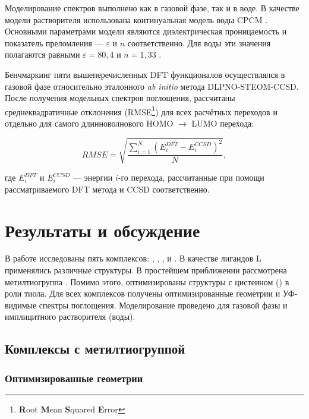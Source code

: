 \documentclass[a4paper,12pt]{article}
\newcommand{\rarr}{\rightarrow}
\begin{document}
\begin{onehalfspace}
	Моделирование спектров выполнено как в газовой фазе, так и в воде. В качестве модели растворителя использована континуальная модель воды CPCM \cite{ORCA_cpcm_1}. Основными параметрами модели являются диэлектрическая проницаемость и показатель преломления — $\varepsilon$ и $n$ соответственно. Для воды эти значения полагаются равными $\varepsilon=80,4$ и $n=1,33$ \cite{ORCA_cpcm_2}.
	
	Бенчмаркинг пяти вышеперечисленных DFT функционалов осуществлялся в газовой фазе относительно эталонного \textit{ab initio} метода DLPNO-STEOM-CCSD. После получения модельных спектров поглощения, рассчитаны среднеквадратичные отклонения (RMSE\footnote{\textbf{R}oot \textbf{M}ean \textbf{S}quared \textbf{E}rror}) для всех расчётных переходов и отдельно для самого длинноволнового HOMO $\rarr$ LUMO перехода:
	
	\begin{equation}
		RMSE = \sqrt{\frac{\sum\limits_{i=1}^N (E^{DFT}_i-E^{CCSD}_i)^2}{N}},
	\end{equation}
	
	где $E^{DFT}_i$ и $E^{CCSD}_i$ — энергии $i$-го перехода, рассчитанные при помощи рассматриваемого DFT метода и CCSD соответственно.
	
	\newpage
	
	\section*{Результаты и обсуждение}
	
	В работе исследованы пять комплексов:  , , ,  и . В качестве лигандов \ce L применялись различные структуры. В простейшем приближении рассмотрена метилтиогруппа . Помимо этого, оптимизированы структуры с цистеином () в роли тиола. Для всех комплексов получены оптимизированные геометрии и УФ-видимые спектры поглощения. Моделирование проведено для газовой фазы и имплицитного растворителя (воды). 
	
	\subsection*{Комплексы с метилтиогруппой}
	
	\subsubsection*{Оптимизированные геометрии}
	

\end{onehalfspace}
\end{document}
